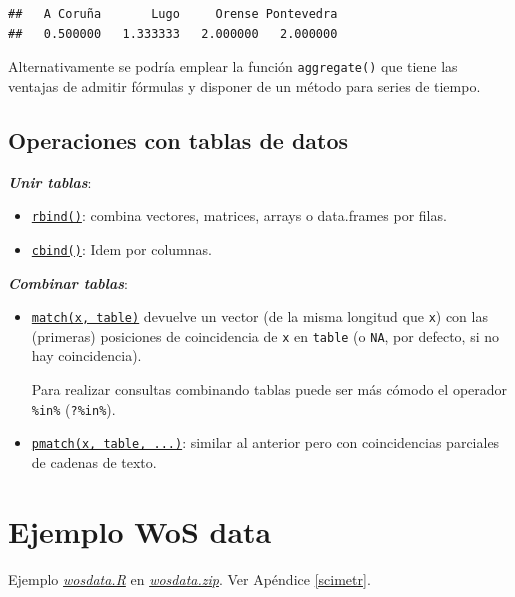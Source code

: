 \documentclass[
]{book}
\begin{document}
\begin{verbatim}
##   A Coruña       Lugo     Orense Pontevedra 
##   0.500000   1.333333   2.000000   2.000000
\end{verbatim}

Alternativamente se podría emplear la función \texttt{aggregate()} que tiene las ventajas de admitir fórmulas y disponer de un método para series de tiempo.

\subsection{Operaciones con tablas de datos}\label{operaciones-con-tablas-de-datos}

\textbf{\emph{Unir tablas}}:

\begin{itemize}
\item
  \href{https://www.rdocumentation.org/packages/base/versions/3.6.1/topics/rbind}{\texttt{rbind()}}: combina vectores, matrices, arrays o data.frames por filas.
\item
  \href{https://www.rdocumentation.org/packages/base/versions/3.6.1/topics/cbind}{\texttt{cbind()}}: Idem por columnas.
\end{itemize}

\textbf{\emph{Combinar tablas}}:

\begin{itemize}
\item
  \href{https://www.rdocumentation.org/packages/base/versions/3.6.1/topics/match}{\texttt{match(x,\ table)}} devuelve un vector (de la misma longitud que \texttt{x}) con las (primeras) posiciones de coincidencia de \texttt{x} en \texttt{table} (o \texttt{NA}, por defecto, si no hay coincidencia).

  Para realizar consultas combinando tablas puede ser más cómodo el operador \texttt{\%in\%} (\texttt{?\textquotesingle{}\%in\%\textquotesingle{}}).
\item
  \href{https://www.rdocumentation.org/packages/base/versions/3.6.1/topics/pmatch}{\texttt{pmatch(x,\ table,\ ...)}}: similar al anterior pero con coincidencias parciales de cadenas de texto.
\end{itemize}

\section{Ejemplo WoS data}\label{ejemplo-wos-data}

Ejemplo \href{data/wosdata.R}{\emph{wosdata.R}} en \href{data/wosdata.zip}{\emph{wosdata.zip}}.
Ver Apéndice \ref{scimetr}.
\end{document}
